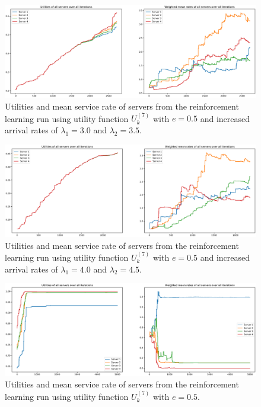 \begin{figure}[H]
    \includegraphics[width=\textwidth]{chapters/00_appendix/03_more_rl_results/Bin/utility_7_eps/u7_4_e05_Lambda_65.eps}
    \caption{Utilities and mean service rate of servers from the reinforcement
    learning run using utility function \(U_k^{(7)}\) with \(e = 0.5\) and
    increased arrival rates of \(\lambda_1 = 3.0\) and \(\lambda_2 = 3.5\).}
    \label{fig:RL_utility7_4_e05_Lambda_65}
\end{figure}

\begin{figure}[H]
    \includegraphics[width=\textwidth]{chapters/00_appendix/03_more_rl_results/Bin/utility_7_eps/u7_4_e05_Lambda_85.eps}
    \caption{Utilities and mean service rate of servers from the reinforcement
    learning run using utility function \(U_k^{(7)}\) with \(e = 0.5\) and
    increased arrival rates of \(\lambda_1 = 4.0\) and \(\lambda_2 = 4.5\).}
    \label{fig:RL_utility7_4_e05_Lambda_85}
\end{figure}

\begin{figure}[H]
    \includegraphics[width=\textwidth]{chapters/00_appendix/03_more_rl_results/Bin/utility_7_eps/u7_4_e05.eps}
    \caption{Utilities and mean service rate of servers from the reinforcement
    learning run using utility function \(U_k^{(7)}\) with \(e = 0.5\).}
    \label{fig:RL_utility7_4_e05}
\end{figure}

